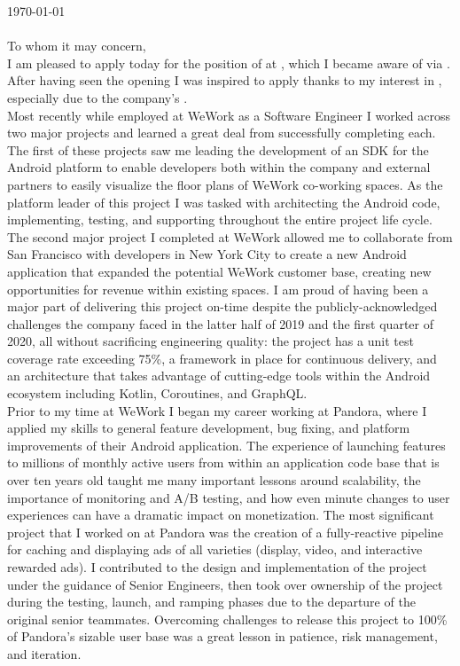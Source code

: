 \noindent\today
\\

\noindent\companyHeader
\\

\noindent To whom it may concern, \\

\noindent I am pleased to apply today for the position of \role \space at \company, which I became aware of via . After having seen the opening I was inspired to apply thanks to my interest in \interest, especially due to the company's \especially. \extraDetail\\

\noindent Most recently while employed at WeWork as a Software Engineer I worked across two major projects and learned a great deal from successfully completing each. The first of these projects saw me leading the development of an SDK for the Android platform to enable developers both within the company and external partners to easily visualize the floor plans of WeWork co-working spaces. As the platform leader of this project I was tasked with architecting the Android code, implementing, testing, and supporting throughout the entire project life cycle. The second major project I completed at WeWork allowed me to collaborate from San Francisco with developers in New York City to create a new Android application that expanded the potential WeWork customer base, creating new opportunities for revenue within existing spaces.  I am proud of having been a major part of delivering this project on-time despite the publicly-acknowledged challenges the company faced in the latter half of 2019 and the first quarter of 2020, all without sacrificing engineering quality: the project has a unit test coverage rate exceeding 75\%, a framework in place for continuous delivery, and an architecture that takes advantage of cutting-edge tools within the Android ecosystem including Kotlin, Coroutines, and GraphQL.\\

\noindent Prior to my time at WeWork I began my career working at Pandora, where I applied my skills to general feature development, bug fixing, and platform improvements of their Android application. The experience of launching features to millions of monthly active users from within an application code base that is over ten years old taught me many important lessons around scalability, the importance of monitoring and A/B testing, and how even minute changes to user experiences can have a dramatic impact on monetization. The most significant project that I worked on at Pandora was the creation of a fully-reactive pipeline for caching and displaying ads of all varieties (display, video, and interactive rewarded ads). I contributed to the design and implementation of the project under the guidance of Senior Engineers, then took over ownership of the project during the testing, launch, and ramping phases due to the departure of the original senior teammates. Overcoming challenges to release this project to 100\% of Pandora's sizable user base was a great lesson in patience, risk management, and iteration.\\


